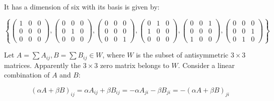 \documentclass[12pt]{article}
\begin{document}
\begin{correction}
    It has a dimension of six with its basis is given by:

    \begin{equation}
        \left\{
        \begin{pmatrix}
            1 & 0 & 0 \\
            0 & 0 & 0 \\
            0 & 0 & 0
        \end{pmatrix},
        \begin{pmatrix}
            0 & 0 & 0 \\
            0 & 1 & 0 \\
            0 & 0 & 0
        \end{pmatrix},
        \begin{pmatrix}
            0 & 0 & 0 \\
            0 & 0 & 0 \\
            0 & 0 & 1
        \end{pmatrix},
        \begin{pmatrix}
            0 & 1 & 0 \\
            1 & 0 & 0 \\
            0 & 0 & 0
        \end{pmatrix},
        \begin{pmatrix}
            0 & 0 & 1 \\
            0 & 0 & 0 \\
            1 & 0 & 0
        \end{pmatrix},
        \begin{pmatrix}
            0 & 0 & 0 \\
            0 & 0 & 1 \\
            0 & 1 & 0
        \end{pmatrix}
        \right\}
    \end{equation}
\end{correction}

Let $A = \sum A_{ij}, B = \sum B_{ij} \in W$, where $W$ is the subset of antisymmetric $3 \times 3$ matrices. Apparently the $3 \times 3$ zero matrix belongs to $W$. Consider a linear combination of $A$ and $B$:

\begin{equation}
    (\alpha A + \beta B)_{ij} = \alpha A_{ij} + \beta B_{ij} = -\alpha A_{ji} - \beta B_{ji} = -(\alpha A + \beta B)_{ji}
\end{equation}
\end{document}
